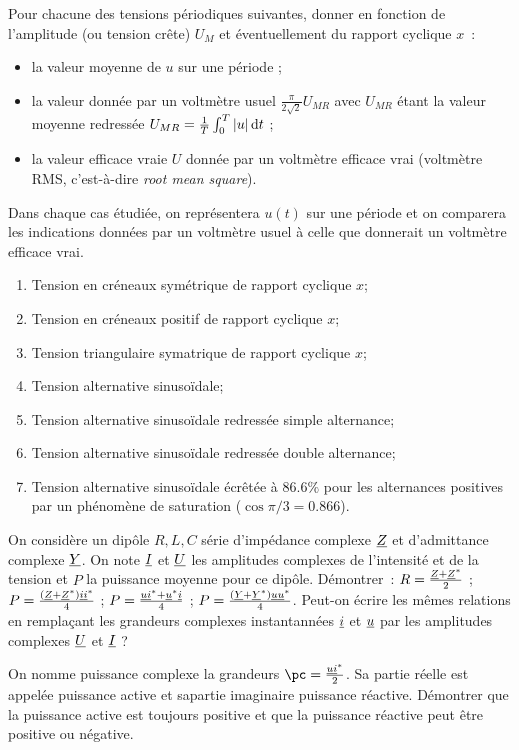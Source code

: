 	\begin{exercice}
		Pour chacune des tensions périodiques suivantes, donner en fonction de l'amplitude (ou tension crête) $U_M$ et éventuellement du rapport cyclique $x$~:
		\begin{itemize}
			\item la valeur moyenne de $u$ sur une période ;
			\item la valeur donnée par un voltmètre usuel $\frac{\pi}{2\sqrt{2}} U_{MR}$ avec $U_{MR}$ étant la valeur moyenne redressée $U_{MR} = \frac{1}{T} \int_0^T \left\lvert u\right\rvert \mathrm{d} t$ ;
			\item la valeur efficace vraie $U$ donnée par un voltmètre efficace vrai (voltmètre RMS, c'est-à-dire \emph{root mean square}).
		\end{itemize}
		
		Dans chaque cas étudiée, on représentera $u(t)$ sur une période et on comparera les indications données par un voltmètre usuel à celle que donnerait un voltmètre efficace vrai.
		\begin{enumerate}
			\item Tension en créneaux symétrique de rapport cyclique $x$; 
			\item Tension en créneaux positif de rapport cyclique $x$;
			\item Tension triangulaire symatrique de rapport cyclique $x$;
			\item Tension alternative sinusoïdale;
			\item Tension alternative sinusoïdale redressée simple alternance;
			\item Tension alternative sinusoïdale redressée double alternance;
			\item Tension alternative sinusoïdale écrêtée à $86.6\%$ pour les alternances positives par un phénomène de saturation ($\cos\pi/3 = 0.866$).
		\end{enumerate}
	\end{exercice}
	\begin{exercice}
		On considère un dipôle $R, L, C$ série d'impédance complexe $\underline{Z}$ et d'admittance complexe $\underline{Y}$. On note $\underline{I}$ et $\underline{U}$ les amplitudes complexes de l'intensité et de la tension et $P$ la puissance moyenne pour ce dipôle. Démontrer~: $R = \frac{\underline{Z} + \underline{Z}^*}{2}$ ; $P = \frac{(\underline{Z} + \underline{Z}^*)\underline{i} \underline{i}^*}{4}$ ; $P = \frac{\underline{u}\underline{i}^* + \underline{u}^*\underline{i}}{4}$ ; $P = \frac{(\underline{Y}+\underline{Y}^*)\underline{u}\underline{u}^*}{4}$. Peut-on écrire les mêmes relations en remplaçant les grandeurs complexes instantannées $\underline{i}$ et $\underline{u}$ par les amplitudes complexes $\underline{U}$ et $\underline{I}$ ? 

		On nomme puissance complexe la grandeurs $\pc = \frac{\uc \ic^*}{2}$. Sa partie réelle est appelée puissance active et sapartie imaginaire puissance réactive. Démontrer que la puissance active est toujours positive et que la puissance réactive peut être positive ou négative.
	\end{exercice}
